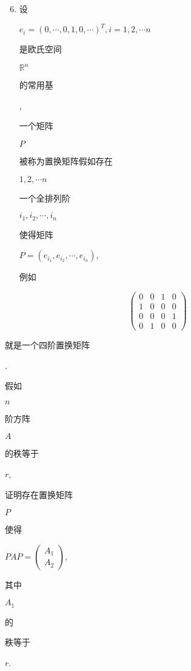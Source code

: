\documentclass[10pt]{article}
\begin{document}
\begin{enumerate}
  \setcounter{enumi}{5}
  \item \begin{CJK}{UTF8}{mj}设\end{CJK} $e_{i}=(0, \cdots, 0,1,0, \cdots)^{T}, i=1,2, \cdots n$ \begin{CJK}{UTF8}{mj}是欧氏空间\end{CJK} $\mathbb{R}^{n}$ \begin{CJK}{UTF8}{mj}的常用基\end{CJK}, \begin{CJK}{UTF8}{mj}一个矩阵\end{CJK} $P$ \begin{CJK}{UTF8}{mj}被称为置换矩阵假如存在\end{CJK} $1,2, \cdots n$ \begin{CJK}{UTF8}{mj}一个全排列阶\end{CJK} $i_{1}, i_{2}, \cdots, i_{n}$ \begin{CJK}{UTF8}{mj}使得矩阵\end{CJK} $P=\left(e_{i_{1}}, e_{i_{2}}, \cdots, e_{i_{n}}\right)$, \begin{CJK}{UTF8}{mj}例如\end{CJK}
\end{enumerate}
$$
\left(\begin{array}{llll}
0 & 0 & 1 & 0 \\
1 & 0 & 0 & 0 \\
0 & 0 & 0 & 1 \\
0 & 1 & 0 & 0
\end{array}\right)
$$
\begin{CJK}{UTF8}{mj}就是一个四阶置换矩阵\end{CJK}. \begin{CJK}{UTF8}{mj}假如\end{CJK} $n$ \begin{CJK}{UTF8}{mj}阶方阵\end{CJK} $A$ \begin{CJK}{UTF8}{mj}的秩等于\end{CJK} $r$, \begin{CJK}{UTF8}{mj}证明存在置换矩阵\end{CJK} $P$ \begin{CJK}{UTF8}{mj}使得\end{CJK} $P A P=\left(\begin{array}{l}A_{1} \\ A_{2}\end{array}\right)$, \begin{CJK}{UTF8}{mj}其中\end{CJK} $A_{1}$ \begin{CJK}{UTF8}{mj}的\end{CJK} \begin{CJK}{UTF8}{mj}秩等于\end{CJK} $r$.
\end{document}
